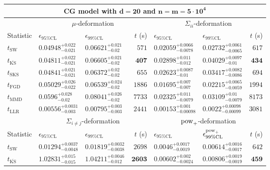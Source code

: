 \begin{tabular}{l|llr|llr}
	\toprule
	\multicolumn{7}{c}{{\bf CG model with $\mathbf{d=20}$ and $\mathbf{n=m=5\cdot 10^{4}}$}} \\
	\toprule
	\multicolumn{1}{c}{} & \multicolumn{3}{c}{$\mu$-deformation} & \multicolumn{3}{c}{$\Sigma_{ii}$-deformation} \\
	Statistic & $\epsilon_{95\%\mathrm{CL}}$ & $\epsilon_{99\%\mathrm    {CL}}$ & $t$ (s) & $\epsilon_{95\%\mathrm{CL}}$ & $\epsilon_{99\%\mathrm{CL}}$ & $t$ (s) \\
	\midrule
	$t_{\mathrm{SW}}$ & $0.04948_{-0.021}^{+0.022}$ & $0.06621_{-0.02}^{+0.021}$ & $571$ & $0.02059_{-0.0078}^{+0.0066}$ & $0.02732_{-0.0065}^{+0.0061}$ & $617$ \\
	$t_{\overline{\mathrm{KS}}}$ & ${\mathbf{0.04811_{-0.021}^{+0.022}}}$ & $0.06605_{-0.02}^{+0.021}$ & ${\mathbf{407}}$ & $0.02898_{-0.012}^{+0.011}$ & $0.04029_{-0.01}^{+0.0097}$ & ${\mathbf{434}}$ \\
	$t_{\mathrm{SKS}}$ & $0.04841_{-0.021}^{+0.021}$ & ${\mathbf{0.06372_{-0.02}^{+0.02}}}$ & $655$ & $0.02623_{-0.01}^{+0.0087}$ & $0.03417_{-0.0086}^{+0.0082}$ & $694$ \\
	$t_{\mathrm{FGD}}$ & $0.05029_{-0.022}^{+0.026}$ & $0.06539_{-0.02}^{+0.024}$ & $1886$ & ${\mathbf{0.01695_{-0.007}^{+0.007}}}$ & ${\mathbf{0.02215_{-0.0059}^{+0.0065}}}$ & $1994$ \\
	$t_{\mathrm{MMD}}$ & $0.0596_{-0.02}^{+0.028}$ & $0.08041_{-0.02}^{+0.026}$ & $7733$ & $0.02325_{-0.0079}^{+0.011}$ & $0.03109_{-0.0079}^{+0.01}$ & $8173$ \\
	$t_{\mathrm{LLR}}$ & $0.00556_{-0.003}^{+0.0031}$ & $0.00795_{-0.003}^{+0.003}$ & $2441$ & $0.00153_{-0.00098}^{+0.001}$ & $0.0022_{-0.00099}^{+0.00098}$ & $3081$ \\
	\toprule
	\multicolumn{1}{c}{} & \multicolumn{3}{c}{$\Sigma_{i\neq j}$-deformation} & \multicolumn{3}{c}{$\rm{pow}_{+}$-deformation} \\
	Statistic & $\epsilon_{95\%\mathrm{CL}}$ & $\epsilon_{99\%\mathrm{CL}}$ & $t$ (s) & $\epsilon_{95\%\mathrm{CL}}$ & $\epsilon^{\rm   {pow}_{+}}_{99\%\mathrm{CL}}$ & $t$ (s) \\
	\midrule
	$t_{\mathrm{SW}}$ & $0.01294_{-0.0048}^{+0.0037}$ & $0.01819_{-0.0038}^{+0.0032}$ & $2698$ & $0.0046_{-0.0019}^{+0.0017}$ & $0.00614_{-0.0017}^{+0.0016}$ & $642$ \\
	$t_{\overline{\mathrm{KS}}}$ & $1.02831_{-0.015}^{+0.015}$ & $1.04211_{-0.012}^{+0.0046}$ & ${\mathbf{2603}}$ & $0.00602_{-0.0024}^{+0.002}$ & $0.00806_{-0.0019}^{+0.0019}$ & ${\mathbf{459}}$ \\

\end{tabular}
